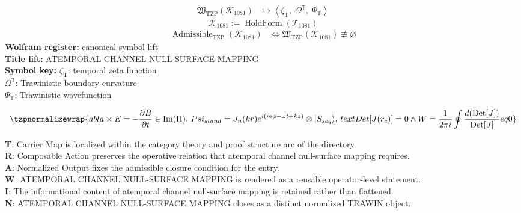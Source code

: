 \noindent
\begin{minipage}[t]{0.48\linewidth}
\begingroup
\small
\[
\begin{aligned}
\mathfrak{W}_{\mathrm{TZP}}\!\left(\mathcal{K}_{1081}\right)
&\longmapsto
\left\langle \zeta_{\mathrm{T}},\; \Omega^{\mathbb{T}},\; \Psi_{\mathrm{T}} \right\rangle
\end{aligned}
\]
\[
\mathcal{K}_{1081}
:=
\operatorname{HoldForm}\!\left(\mathcal{T}_{1081}\right)
\]
\[
\begin{aligned}
\operatorname{Admissible}_{\mathrm{TZP}}\!\left(\mathcal{K}_{1081}\right)
&\Longleftrightarrow
\mathfrak{W}_{\mathrm{TZP}}\!\left(\mathcal{K}_{1081}\right)\not\equiv\varnothing
\end{aligned}
\]
\textbf{Wolfram register:} canonical symbol lift\\
\textbf{Title lift:} ATEMPORAL CHANNEL NULL-SURFACE MAPPING\\
\textbf{Symbol key:} \(\zeta_{\mathrm{T}}\): temporal zeta function\\ \(\Omega^{\mathbb{T}}\): Trawinistic boundary curvature\\ \(\Psi_{\mathrm{T}}\): Trawinistic wavefunction
\par
\endgroup
\end{minipage}\hfill
\begin{minipage}[t]{0.48\linewidth}
\[
\tzpnormalizewrap{abla \times E = -\frac{\partial B}{\partial t} \in \text{Im}(\Pi),\,Psi_{stand} = J_n(kr) e^{i(m\phi - \omega t + kz)} \otimes |S_{seq}\rangle,\,text{Det}[J(r_c)] = 0 \land W = \frac{1}{2\pi i} \oint \frac{d(\text{Det}[J])}{\text{Det}[J]}  eq 0}
\]

\small
\textbf{T}: Carrier Map is localized within the category theory and proof structure arc of the directory.\\
\textbf{R}: Composable Action preserves the operative relation that atemporal channel null-surface mapping requires.\\
\textbf{A}: Normalized Output fixes the admissible closure condition for the entry.\\
\textbf{W}: ATEMPORAL CHANNEL NULL-SURFACE MAPPING is rendered as a reusable operator-level statement.\\
\textbf{I}: The informational content of atemporal channel null-surface mapping is retained rather than flattened.\\
\textbf{N}: ATEMPORAL CHANNEL NULL-SURFACE MAPPING closes as a distinct normalized TRAWIN object.
\normalsize
\end{minipage}

